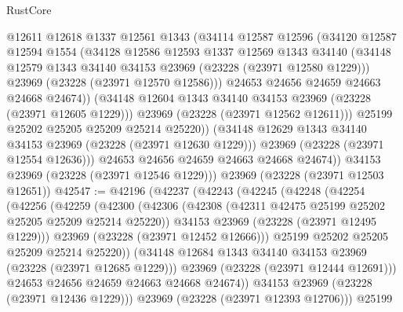 \begin{lexlean}{RustCore}
\begin{coremodule}
                  @12611
                  @12618
                  @1337
                  @12561
                  @1343
                  (@34114
                    @12587
                    @12596
                    (@34120
                      @12587
                      @12594
                      @1554
                      (@34128
                        @12586
                        @12593
                        @1337
                        @12569
                        @1343
                        @34140
                        (@34148 @12579 @1343 @34140 @34153 @23969 (@23228 (@23971 @12580 @1229)))
                        @23969
                        (@23228 (@23971 @12570 @12586)))
                      @24653
                      @24656
                      @24659
                      @24663
                      @24668
                      @24674))
                  (@34148 @12604 @1343 @34140 @34153 @23969 (@23228 (@23971 @12605 @1229)))
                  @23969
                  (@23228 (@23971 @12562 @12611)))
                @25199
                @25202
                @25205
                @25209
                @25214
                @25220))
            (@34148 @12629 @1343 @34140 @34153 @23969 (@23228 (@23971 @12630 @1229)))
            @23969
            (@23228 (@23971 @12554 @12636)))
          @24653
          @24656
          @24659
          @24663
          @24668
          @24674))
      @34153
      @23969
      (@23228 (@23971 @12546 @1229)))
    @23969
    (@23228 (@23971 @12503 @12651))
@42547 := @42196
    (@42237
      (@42243
        (@42245
          (@42248
            (@42254
              (@42256
                (@42259
                  (@42300
                    (@42306
                      (@42308 (@42311 @42475 @25199 @25202 @25205 @25209 @25214 @25220))
                      @34153
                      @23969
                      (@23228 (@23971 @12495 @1229)))
                    @23969
                    (@23228 (@23971 @12452 @12666)))
                  @25199
                  @25202
                  @25205
                  @25209
                  @25214
                  @25220))
              (@34148 @12684 @1343 @34140 @34153 @23969 (@23228 (@23971 @12685 @1229)))
              @23969
              (@23228 (@23971 @12444 @12691)))
            @24653
            @24656
            @24659
            @24663
            @24668
            @24674))
        @34153
        @23969
        (@23228 (@23971 @12436 @1229)))
      @23969
      (@23228 (@23971 @12393 @12706)))
    @25199

\end{coremodule}
\end{lexlean}
